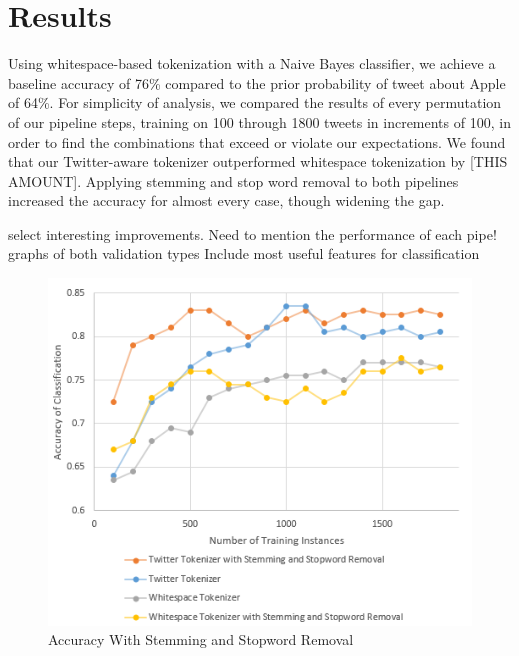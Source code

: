 \documentclass[letterpaper]{article}
\begin{document}
\section{Results}
Using whitespace-based tokenization with a Naive Bayes classifier, we achieve a baseline accuracy of 76\% %
compared to the prior probability of tweet about Apple of 64\%. For simplicity of analysis, we compared the results of every permutation of our pipeline steps, training on 100 through 1800 tweets in increments of 100, in order to find the combinations that exceed or violate our expectations. We found that our Twitter-aware tokenizer outperformed whitespace tokenization by [THIS AMOUNT]. Applying stemming and stop word removal to both pipelines increased the accuracy for almost every case, though widening the gap. 

  select interesting improvements.
  Need to mention the performance of each pipe!
  graphs of both validation types
  Include most useful features for classification

\begin{figure}[ht]
\centering
\includegraphics[width=\linewidth]{chart_twitterVSwhitespace}
\caption{Accuracy With Stemming and Stopword Removal}
\label{fig:chart_twitterwhitespace}
\end{figure}
\end{document}
